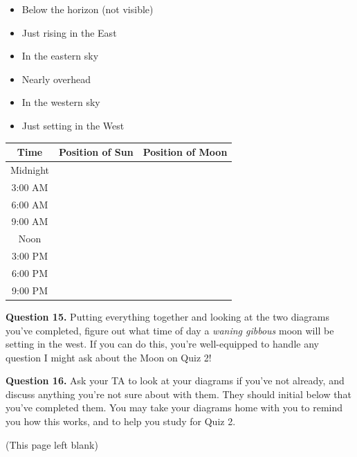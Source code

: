 \documentclass[11pt]{article}
\begin{document}
\begin{itemize}
	\item Below the horizon (not visible)
	\item Just rising in the East
	\item In the eastern sky
	\item Nearly overhead
	\item In the western sky
	\item Just setting in the West
\end{itemize}
\Large
\begin{tabular}{|c|c|c|}
\hline 

Time & Position of Sun & Position of Moon \\ \hline
Midnight & & \\ \hline
3:00 AM & & \\ \hline
6:00 AM & & \\ \hline
9:00 AM & & \\ \hline
Noon   & & \\ \hline
3:00 PM & & \\ \hline
6:00 PM & & \\ \hline
9:00 PM & & \\ \hline
\end{tabular}
\normalsize
\vspace{1.5cm}

\textbf{Question 15.} Putting everything together and looking at the two diagrams you've completed, figure out what time of day a {\it waning gibbous} moon will be setting in the west. If you can do this, you're well-equipped to handle any question I might ask about the Moon on Quiz 2!

\vspace{1.5in}

\textbf{Question 16.} Ask your TA to look at your diagrams if you've not already, and discuss anything you're not sure about with them.
They should initial below that you've completed them. You may take your diagrams home with you to remind you how this works, and to help you
study for Quiz 2.

\newpage
\begin{center}
	(This page left blank)
\end{center}

\newpage
\end{document}
